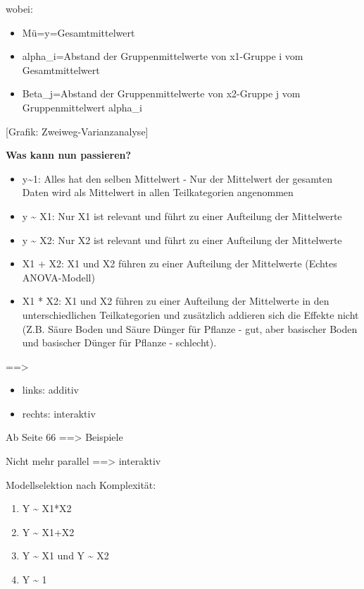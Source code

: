 \documentclass[
]{article}
\providecommand{\tightlist}{%
  \setlength{\itemsep}{0pt}\setlength{\parskip}{0pt}}
\begin{document}
wobei:

\begin{itemize}
\tightlist
\item
  Mü=y=Gesamtmittelwert
\item
  alpha\_i=Abstand der Gruppenmittelwerte von x1-Gruppe i vom
  Gesamtmittelwert
\item
  Beta\_j=Abstand der Gruppenmittelwerte von x2-Gruppe j vom
  Gruppenmittelwert alpha\_i
\end{itemize}

{[}Grafik: Zweiweg-Varianzanalyse{]}

\textbf{Was kann nun passieren?}

\begin{itemize}
\item
  y\textasciitilde1: Alles hat den selben Mittelwert - Nur der
  Mittelwert der gesamten Daten wird als Mittelwert in allen
  Teilkategorien angenommen
\item
  y \textasciitilde{} X1: Nur X1 ist relevant und führt zu einer
  Aufteilung der Mittelwerte
\item
  y \textasciitilde{} X2: Nur X2 ist relevant und führt zu einer
  Aufteilung der Mittelwerte
\item
  X1 + X2: X1 und X2 führen zu einer Aufteilung der Mittelwerte (Echtes
  ANOVA-Modell)
\item
  X1 * X2: X1 und X2 führen zu einer Aufteilung der Mittelwerte in den
  unterschiedlichen Teilkategorien und zusätzlich addieren sich die
  Effekte nicht (Z.B. Säure Boden und Säure Dünger für Pflanze - gut,
  aber basischer Boden und basischer Dünger für Pflanze - schlecht).
\end{itemize}

==\textgreater{}

\begin{itemize}
\tightlist
\item
  links: additiv
\item
  rechts: interaktiv
\end{itemize}

Ab Seite 66 ==\textgreater{} Beispiele

Nicht mehr parallel ==\textgreater{} interaktiv

Modellselektion nach Komplexität:

\begin{enumerate}
\def\labelenumi{\arabic{enumi}.}
\tightlist
\item
  Y \textasciitilde{} X1*X2
\item
  Y \textasciitilde{} X1+X2
\item
  Y \textasciitilde{} X1 und Y \textasciitilde{} X2
\item
  Y \textasciitilde{} 1
\end{enumerate}
\end{document}

